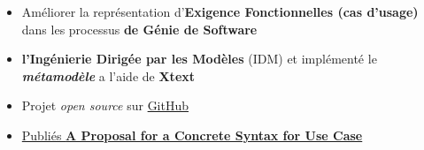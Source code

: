 
    {\begin{itemize}
        \item Améliorer la représentation d'\textbf{Exigence Fonctionnelles (cas d'usage)} dans les processus \textbf{de Génie de Software}
        \vspace{-5pt}\item\textbf{l'Ingénierie Dirigée par les Modèles} (IDM) et implémenté le \textbf{\textit{métamodèle}} a l'aide de \textbf{Xtext}
        \vspace{-5pt}\item Projet \textit{open source} sur \href{}{GitHub \textcolor{maincol}{\faGithub}}
    \end{itemize}}{}{}{\begin{itemize}
        \item \href{https://sol.sbc.org.br/index.php/sbsi_estendido/article/view/15353}{Publiés \textbf{A Proposal for a Concrete Syntax for Use Case} \textcolor{maincol}{\faFile}}
    \end{itemize}}
    
    